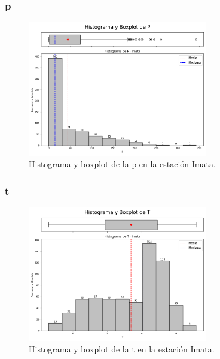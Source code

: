 \subsubsection*{\gls{p} }
\begin{figure}[htbp]
\centering
\includegraphics[width=0.7\textwidth]{resultados/por_estacion_meteorologica/Imata/P_histograma.png}
\caption{Histograma y boxplot de la \gls{p}  en la estación Imata.}
\label{fig:imata_P}
\end{figure}

\subsubsection*{\gls{t} }
\begin{figure}[htbp]
\centering
\includegraphics[width=0.7\textwidth]{resultados/por_estacion_meteorologica/Imata/T_histograma.png}
\caption{Histograma y boxplot de la \gls{t}  en la estación Imata.}
\label{fig:imata_T}
\end{figure}

